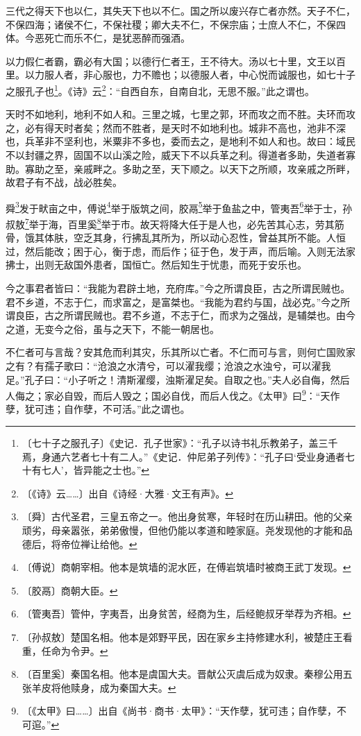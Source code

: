 \documentclass[12pt,UTF-8,openany]{ctexbook}
\begin{document}
\begin{normalsize}
    
    三代之得天下也以仁，其失天下也以不仁。国之所以废兴存亡者亦然。天子不仁，不保四海；诸侯不仁，不保社稷；卿大夫不仁，不保宗庙；士庶人不仁，不保四体。今恶死亡而乐不仁，是犹恶醉而强酒。
    
    以力假仁者霸，霸必有大国；以德行仁者王，王不待大。汤以七十里，文王以百里。以力服人者，非心服也，力不赡也；以德服人者，中心悦而诚服也，如七十子之服孔子也\footnote{〔七十子之服孔子〕《史记．孔子世家》：“孔子以诗书礼乐教弟子，盖三千焉，身通六艺者七十有二人。”《史记．仲尼弟子列传》：“孔子曰‘受业身通者七十有七人’，皆异能之士也。”}。《诗》云\footnote{〔《诗》云……〕出自《诗经·大雅·文王有声》。}：“自西自东，自南自北，无思不服。”此之谓也。
    
    天时不如地利，地利不如人和。三里之城，七里之郭，环而攻之而不胜。夫环而攻之，必有得天时者矣；然而不胜者，是天时不如地利也。城非不高也，池非不深也，兵革非不坚利也，米粟非不多也，委而去之，是地利不如人和也。故曰：域民不以封疆之界，固国不以山溪之险，威天下不以兵革之利。得道者多助，失道者寡助。寡助之至，亲戚畔之。多助之至，天下顺之。以天下之所顺，攻亲戚之所畔，故君子有不战，战必胜矣。
    
    舜\footnote{〔舜〕古代圣君，三皇五帝之一。他出身贫寒，年轻时在历山耕田。他的父亲顽劣，母亲嚣张，弟弟傲慢，但他仍能以孝道和睦家庭。尧发现他的才能和品德后，将帝位禅让给他。}发于畎亩之中，傅说\footnote{〔傅说〕商朝宰相。他本是筑墙的泥水匠，在傅岩筑墙时被商王武丁发现。}举于版筑之间，胶鬲\footnote{〔胶鬲〕商朝大臣。}举于鱼盐之中，管夷吾\footnote{〔管夷吾〕管仲，字夷吾，出身贫苦，经商为生，后经鲍叔牙举荐为齐相。}举于士，孙叔敖\footnote{〔孙叔敖〕楚国名相。他本是郊野平民，因在家乡主持修建水利，被楚庄王看重，任命为令尹。}举于海，百里奚\footnote{〔百里奚〕秦国名相。他本是虞国大夫。晋献公灭虞后成为奴隶。秦穆公用五张羊皮将他赎身，成为秦国大夫。}举于市。故天将降大任于是人也，必先苦其心志，劳其筋骨，饿其体肤，空乏其身，行拂乱其所为，所以动心忍性，曾益其所不能。人恒过，然后能改；困于心，衡于虑，而后作；征于色，发于声，而后喻。入则无法家拂士，出则无敌国外患者，国恒亡。然后知生于忧患，而死于安乐也。
    
    今之事君者皆曰：“我能为君辟土地，充府库。”今之所谓良臣，古之所谓民贼也。君不乡道，不志于仁，而求富之，是富桀也。“我能为君约与国，战必克。”今之所谓良臣，古之所谓民贼也。君不乡道，不志于仁，而求为之强战，是辅桀也。由今之道，无变今之俗，虽与之天下，不能一朝居也。
    
    不仁者可与言哉？安其危而利其灾，乐其所以亡者。不仁而可与言，则何亡国败家之有？有孺子歌曰：“沧浪之水清兮，可以濯我缨；沧浪之水浊兮，可以濯我足。”孔子曰：“小子听之！清斯濯缨，浊斯濯足矣。自取之也。”夫人必自侮，然后人侮之；家必自毁，而后人毁之；国必自伐，而后人伐之。《太甲》曰\footnote{〔《太甲》曰……〕出自《尚书·商书·太甲》：“天作孽，犹可违；自作孽，不可逭。”}：“天作孽，犹可违；自作孽，不可活。”此之谓也。
\end{normalsize}
\end{document}
